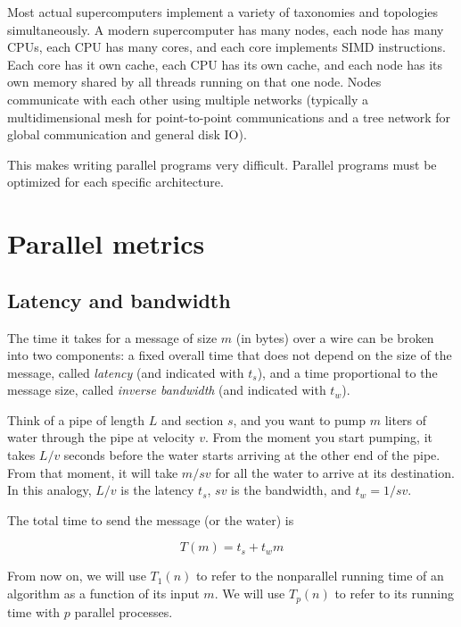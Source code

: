 \documentclass[justified,sixbynine]{tufte-book}
\theoremstyle{plain}%
\theoremstyle{definition}
\theoremstyle{remark}
\begin{document}
\begin{fullwidth}
Most actual supercomputers implement a variety of taxonomies and topologies simultaneously. A modern supercomputer has many nodes, each node has many CPUs, each CPU has many cores, and each core implements SIMD instructions. Each core has it own cache, each CPU has its own cache, and each node has its own memory shared by all threads running on that one node. Nodes communicate with each other using multiple networks (typically a multidimensional mesh for point-to-point communications and a tree network for global communication and general disk IO).

This makes writing parallel programs very difficult. Parallel programs must be optimized for each specific architecture.

\goodbreak\section{Parallel metrics}

\goodbreak\subsection{Latency and bandwidth}


The time it takes for a message of size $m$ (in bytes) over a wire can be broken into two components: a fixed overall time that does not depend on the size of the message, called {\it latency} (and indicated with $t_s$), and a time proportional to the message size, called {\it inverse bandwidth} (and indicated with $t_w$).

Think of a pipe of length $L$ and section $s$, and you want to pump $m$ liters of water through the pipe at velocity $v$. From the moment you start pumping, it takes $L/v$ seconds before the water starts arriving at the other end of the pipe. From that moment, it will take $m / sv$ for all the water to arrive at its destination. In this analogy, $L/v$ is the latency $t_s$, $sv$ is the bandwidth, and $t_w = 1/sv$.

The total time to send the message (or the water) is

\begin{equation}
T(m) = t_s + t_w m
\end{equation}

From now on, we will use $T_1(n)$ to refer to the nonparallel running time of an algorithm as a function of its input $m$. We will use $T_p(n)$ to refer to its running time with $p$ parallel processes.


\end{fullwidth}
\end{document}
